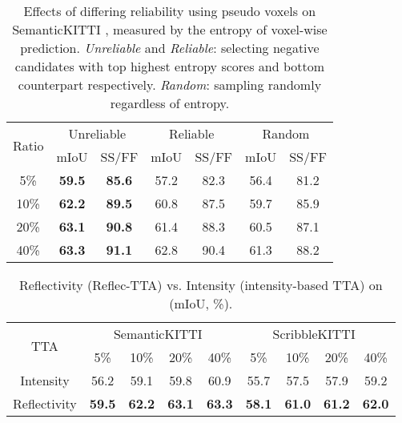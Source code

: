 \documentclass[10pt,twocolumn,letterpaper]{article}
\begin{document}
 \begin{table}[H]
    \scriptsize
    \vspace{-3pt}
    \setlength{\abovecaptionskip}{0.05cm}
    \centering
\caption{Effects of differing reliability using pseudo voxels on SemanticKITTI {\validset}, measured by the entropy of voxel-wise prediction. \textit{Unreliable} and \textit{Reliable}: selecting negative candidates with top  highest entropy scores and bottom  counterpart respectively. \textit{Random}: sampling randomly regardless of entropy.
}
{
\begin{tabular}{c|cc|cc|cc}
\toprule 
 \multirow{2}{*}{Ratio} & \multicolumn{2}{c|}{Unreliable} & \multicolumn{2}{c|}{Reliable} & \multicolumn{2}{c}{Random} \\
 & mIoU & SS/FF & mIoU & SS/FF & mIoU & SS/FF \\
\midrule 
 5\% & \textbf{59.5} & \textbf{85.6} & 57.2 & 82.3 & 56.4 & 81.2 \\
10\% & \textbf{62.2} & \textbf{89.5} & 60.8 & 87.5 & 59.7 & 85.9 \\
20\% & \textbf{63.1} & \textbf{90.8} & 61.4 & 88.3 & 60.5 & 87.1 \\
40\% & \textbf{63.3} & \textbf{91.1} & 62.8 & 90.4 & 61.3 & 88.2 \\
 \bottomrule
\end{tabular}
\label{tab:pseudo}
}
\vspace{-10pt}
\end{table} \begin{table}[!h]
    \scriptsize
    \vspace{-3pt}
    \centering
    \setlength{\abovecaptionskip}{0.05cm}
    \caption{Reflectivity (Reflec-TTA) vs. Intensity (intensity-based TTA) on  {\validset} (mIoU, \%).}
{\begin{tabular}{c|cccc|cccc}
\toprule
\multirow{2}{*}{TTA} & \multicolumn{4}{c|}{SemanticKITTI~\cite{behley2019semantickittia}} & \multicolumn{4}{c}{ScribbleKITTI~\cite{Unal_2022_CVPR}} \\
& 5\% & 10\% & 20\% & 40\% & 5\% & 10\% & 20\% & 40\% \\
\midrule 
Intensity 
& 56.2   & 59.1   & 59.8   & 60.9   & 55.7   & 57.5   & 57.9   & 59.2 \\Reflectivity  & \textbf{59.5}  & \textbf{62.2} & \textbf{63.1} & \textbf{63.3} & \textbf{58.1} & \textbf{61.0}  & \textbf{61.2} & \textbf{62.0} \\
\bottomrule
\end{tabular}}
\label{tab:ref_vs_inten}
\vspace{-10pt}
\end{table}
 
\end{document}
